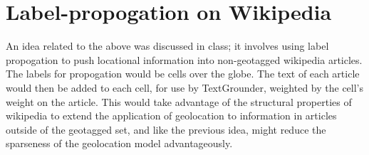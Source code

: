 \documentclass[11pt]{article}
\begin{document}
\section{Label-propogation on Wikipedia}
An idea related to the above was discussed in class; it involves using label
propogation to push locational information into non-geotagged wikipedia
articles.
The labels for propogation would be cells over the globe.
The text of each article would then be added to each cell, for use by
TextGrounder, weighted by the cell's weight on the article.
This would take advantage of the structural properties of wikipedia to extend 
the application of geolocation to information in articles outside of the
geotagged set, and like the previous idea, might reduce the sparseness of the
geolocation model advantageously.



\end{document}
